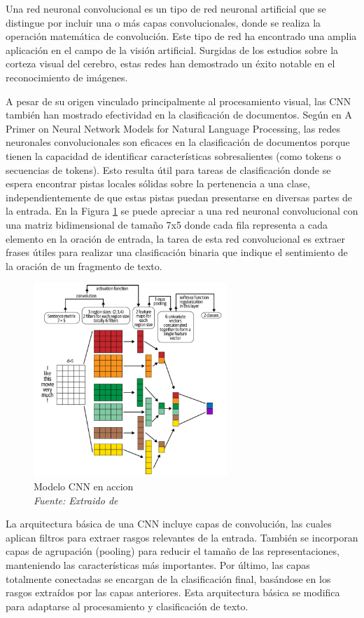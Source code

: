 Una red neuronal convolucional es un tipo de red neuronal artificial que se distingue por incluir una o más capas convolucionales, donde se realiza la operación matemática de convolución. Este tipo de red ha encontrado una amplia aplicación en el campo de la visión artificial. Surgidas de los estudios sobre la corteza visual del cerebro, estas redes han demostrado un éxito notable en el reconocimiento de imágenes.


A pesar de su origen vinculado principalmente al procesamiento visual, las CNN también han mostrado efectividad en la clasificación de documentos. Según \cite{goldberg2016primer} en A Primer on Neural Network Models for Natural Language Processing, las redes neuronales convolucionales son eficaces en la clasificación de documentos porque tienen la capacidad de identificar características sobresalientes (como tokens o secuencias de tokens). Esto resulta útil para tareas de clasificación donde se espera encontrar pistas locales sólidas sobre la pertenencia a una clase, independientemente de que estas pistas puedan presentarse en diversas partes de la entrada. En la Figura \ref{fig:an9} se puede apreciar a una red neuronal convolucional con una matriz bidimensional de tamaño 7x5 donde cada fila representa a cada elemento en la oración de entrada, la tarea de esta red convolucional es extraer frases útiles para realizar una clasificación binaria que indique el sentimiento de la oración de un fragmento de texto.
\begin{figure}
	\includegraphics[width=0.65\textwidth]{capitulo2/figuras/an9.png}
	\caption{Modelo CNN en accion\\\textit{Fuente: Extraido de  \protect\cite[p. 25]{vajjala2020practical}}}
	\label{fig:an9}
\end{figure}

La arquitectura básica de una CNN incluye capas de convolución, las cuales aplican filtros para extraer rasgos relevantes de la entrada. También se incorporan capas de agrupación (pooling) para reducir el tamaño de las representaciones, manteniendo las características más importantes. Por último, las capas totalmente conectadas se encargan de la clasificación final, basándose en los rasgos extraídos por las capas anteriores. Esta arquitectura básica se modifica para adaptarse al procesamiento y clasificación de texto.

